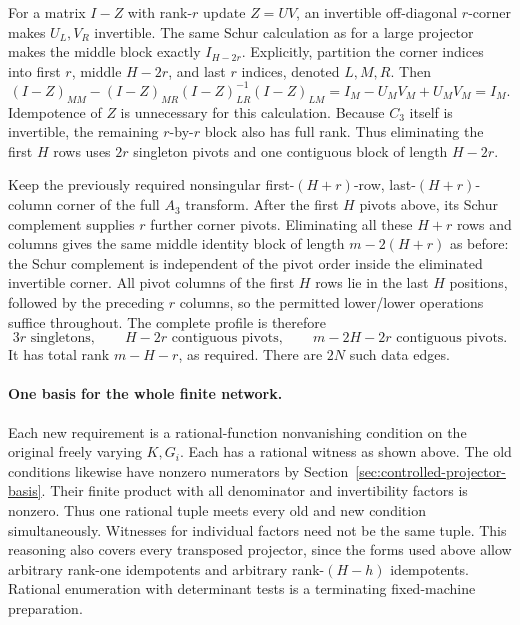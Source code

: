 For a matrix $I-Z$ with rank-$r$ update $Z=UV$, an invertible
off-diagonal $r$-corner makes $U_L,V_R$ invertible. The same Schur
calculation as for a large projector makes the middle block exactly
$I_{H-2r}$. Explicitly, partition the corner indices into first $r$,
middle $H-2r$, and last $r$ indices, denoted $L,M,R$. Then
\[
 (I-Z)_{MM}-(I-Z)_{MR}(I-Z)_{LR}^{-1}(I-Z)_{LM}
 =I_M-U_MV_M+U_MV_M=I_M.
\]
Idempotence of $Z$ is unnecessary for this calculation.
Because $C_3$ itself is invertible, the remaining $r$-by-$r$ block
also has full rank. Thus eliminating the first $H$ rows uses $2r$
singleton pivots and one contiguous block of length $H-2r$.

Keep the previously required nonsingular first-$(H+r)$-row,
last-$(H+r)$-column corner of the full $A_3$ transform. After the
first $H$ pivots above, its Schur complement supplies $r$ further
corner pivots. Eliminating all these $H+r$ rows and columns gives
the same middle identity block of length $m-2(H+r)$ as before:
the Schur complement is independent of the pivot order inside the
eliminated invertible corner. All pivot columns of the first $H$
rows lie in the last $H$ positions, followed by the preceding $r$
columns, so the permitted lower/lower operations suffice throughout.
The complete profile is therefore
\[
 3r\text{ singletons},\qquad
 H-2r\text{ contiguous pivots},\qquad
 m-2H-2r\text{ contiguous pivots}.
\]
It has total rank $m-H-r$, as required. There are $2N$ such data edges.

\paragraph{One basis for the whole finite network.}
Each new requirement is a rational-function nonvanishing condition on
the original freely varying $K,G_i$. Each has a rational witness as
shown above. The old conditions likewise have nonzero numerators by
Section~\ref{sec:controlled-projector-basis}. Their finite product
with all denominator and invertibility factors is nonzero. Thus one
rational tuple meets every old and new condition simultaneously.
Witnesses for individual factors need not be the same tuple. This
reasoning also covers every transposed projector, since the forms
used above allow arbitrary rank-one idempotents and arbitrary
rank-$(H-h)$ idempotents. Rational enumeration with determinant tests
is a terminating fixed-machine preparation.


